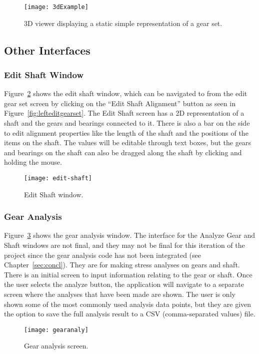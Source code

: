 \begin{doublespace}
\begin{figure}[htbp]
    \centering
    \texttt{[image: 3dExample]}
    \caption{3D viewer displaying a static simple representation of a gear set.}
    \label{fig:3dex}
\end{figure}

\subsection{Other Interfaces}

\subsubsection{Edit Shaft Window}

Figure~\ref{fig:editshaft} shows the edit shaft window, which can be navigated to from the edit gear set screen by clicking on the ``Edit Shaft Alignment'' button as seen in Figure~\ref{fig:lefteditgearset}. The Edit Shaft screen has a 2D representation of a shaft and the gears and bearings connected to it. There is also a bar on the side to edit alignment properties like the length of the shaft and the positions of the items on the shaft. The values will be editable through text boxes, but the gears and bearings on the shaft can also be dragged along the shaft by clicking and holding the mouse.

\begin{figure}[htbp]
    \centering
    \texttt{[image: edit-shaft]}
    \caption{Edit Shaft window.}
    \label{fig:editshaft}
\end{figure}

\subsubsection{Gear Analysis}

Figure~\ref{fig:gearanaly} shows the gear analysis window. The interface for the Analyze Gear and Shaft windows are not final, and they may not be final for this iteration of the project since the gear analysis code has not been integrated (see Chapter~\ref{sec:concl}). They are for making stress analyses on gears and shaft. There is an initial screen to input information relating to the gear or shaft. Once the user selects the analyze button, the application will navigate to a separate screen where the analyses that have been made are shown. The user is only shown some of the most commonly used analysis data points, but they are given the option to save the full analysis result to a CSV (comma-separated values) file.

\begin{figure}[H]
    \centering
    \texttt{[image: gearanaly]}
    \caption{Gear analysis screen.}
    \label{fig:gearanaly}
\end{figure}

\end{doublespace}